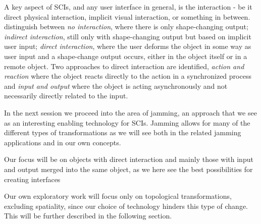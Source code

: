 A key aspect of SCIs, and any user interface in general, is the interaction - be it direct physical interaction, implicit visual interaction, or something in between. 
\citeauthor{rasmussen2012shape} distinguish between \textit{no interaction}, where there is only shape-changing output; \textit{indirect interaction}, still only with shape-changing output but based on implicit user input; \textit{direct interaction}, where the user deforms the object in some way as user input and a shape-change output occurs, either in the object itself or in a remote object.
Two approaches to direct interaction are identified, \textit{action and reaction} where the object reacts directly to the action in a synchronized process and \textit{input and output} where the object is acting asynchronously and not necessarily directly related to the input.

In the next session we proceed into the area of jamming, an approach that we see as an interesting enabling technology for SCIs.
Jamming allows for many of the different types of transformations as we will see both in the related jamming applications and in our own concepts. 

Our focus will be on objects with direct interaction and mainly those with input and output merged into the same object, as we here see the best possibilities for creating interfaces 
 
Our own exploratory work will focus only on topological transformations, excluding spatiality, since our choice of technology hinders this type of change. This will be further described in the following section.